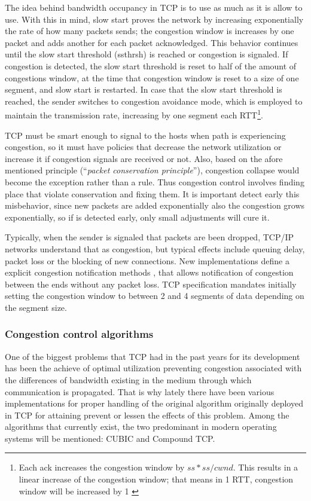 The idea behind bandwidth occupancy in TCP is to use as much as it is allow to
use. With this in mind, slow start proves the network by increasing
exponentially the rate of how many packets sends; the congestion window is
increases by one packet and adds another for each packet acknowledged. This
behavior continues until the slow start threshold (ssthrsh) is reached or
congestion is signaled. If congestion is detected, the slow start threshold is
reset to half of the amount of congestions window, at the time that congestion
window is reset to a size of one segment, and slow start is restarted. In case
that the slow start threshold is reached, the sender switches to congestion
avoidance mode, which is employed to maintain the transmission rate,
increasing by one segment each RTT\footnote{Each ack increases the congestion
window by $ss*ss/cwnd$. This results in a linear increase of the congestion
window; that means in 1 RTT, congestion window will be increased by
1 \cite{JacobsonCAC} \cite{rfc879} \cite{rfc2460}}.

TCP must be smart enough to signal to the hosts when path is experiencing
congestion, so it must have policies that decrease the network utilization or
increase it if congestion signals are received or not. Also, based on the
afore mentioned principle (``\textit{packet conservation principle}''),
congestion collapse would become the exception rather than a rule. Thus
congestion control involves finding place that violate conservation and fixing
them. It is important detect early this misbehavior, since new packets are
added exponentially also the congestion grows exponentially, so if is detected
early, only small adjustments will cure it.

Typically, when the sender is signaled that packets are been dropped, TCP/IP
networks understand that as congestion, but typical effects include queuing
delay, packet loss or the blocking of new connections. New implementations
define a explicit congestion notification methods \cite{rfc3168}, that allows
notification of congestion between the ends without any packet loss. TCP
specification mandates initially setting the congestion window to between 2
and 4 segments of data depending on the segment size\cite{rfc3390}.

\subsubsection{Congestion control algorithms}
One of the biggest problems that TCP had in the past years for its development
has been the achieve of optimal utilization preventing congestion associated
with the differences of bandwidth existing in the medium through which
communication is propagated. That is why lately there have been various
implementations for proper handling of the original algorithm originally
deployed in TCP for attaining prevent or lessen the effects of this problem.
Among the algorithms that currently exist, the two predominant in modern
operating systems will be mentioned: CUBIC and Compound TCP.

